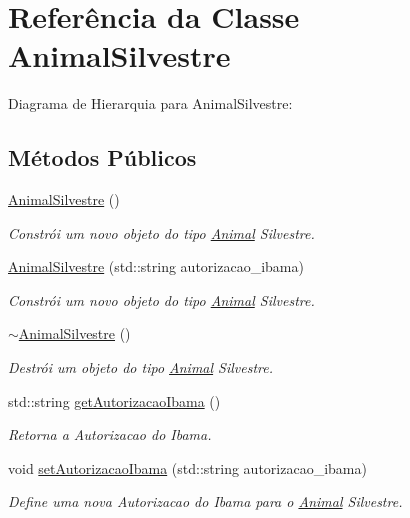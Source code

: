 \hypertarget{classAnimalSilvestre}{}\section{Referência da Classe Animal\+Silvestre}
\label{classAnimalSilvestre}


Diagrama de Hierarquia para Animal\+Silvestre\+:
\subsection*{Métodos Públicos}
\begin{DoxyCompactItemize}
\item 
\mbox{\label{classAnimalSilvestre_ab399a508e477d58526bdde4c49365488}} 
\hyperlink{classAnimalSilvestre_ab399a508e477d58526bdde4c49365488}{Animal\+Silvestre} ()
\begin{DoxyCompactList}\small\item\em Constrói um novo objeto do tipo \hyperlink{classAnimal}{Animal} Silvestre. \end{DoxyCompactList}\item 
\hyperlink{classAnimalSilvestre_aec66dbda96e9aa2bd231fd3b699c948f}{Animal\+Silvestre} (std\+::string autorizacao\+\_\+ibama)
\begin{DoxyCompactList}\small\item\em Constrói um novo objeto do tipo \hyperlink{classAnimal}{Animal} Silvestre. \end{DoxyCompactList}\item 
\mbox{\label{classAnimalSilvestre_a3c7b842e393cda436f252c4eb6021aaa}} 
\hyperlink{classAnimalSilvestre_a3c7b842e393cda436f252c4eb6021aaa}{$\sim$\+Animal\+Silvestre} ()
\begin{DoxyCompactList}\small\item\em Destrói um objeto do tipo \hyperlink{classAnimal}{Animal} Silvestre. \end{DoxyCompactList}\item 
std\+::string \hyperlink{classAnimalSilvestre_a040b1391d175d7572d11deddc7b3e8cb}{get\+Autorizacao\+Ibama} ()
\begin{DoxyCompactList}\small\item\em Retorna a Autorizacao do Ibama. \end{DoxyCompactList}\item 
void \hyperlink{classAnimalSilvestre_ae7c8a7c193ff93fafe05419ff1c5db18}{set\+Autorizacao\+Ibama} (std\+::string autorizacao\+\_\+ibama)
\begin{DoxyCompactList}\small\item\em Define uma nova Autorizacao do Ibama para o \hyperlink{classAnimal}{Animal} Silvestre. \end{DoxyCompactList}\end{DoxyCompactItemize}
